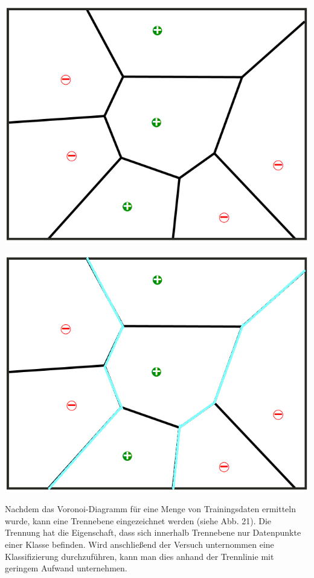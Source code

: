 \documentclass[a4paper]{scrartcl}
\begin{document}
\begin{multicols}{2}
            \includegraphics[width=\linewidth]{vor2.png}
                        
            \includegraphics[width=\linewidth]{vor3.png}
                        
            Nachdem das Voronoi-Diagramm für eine Menge von Trainingsdaten ermitteln wurde, kann eine Trennebene eingezeichnet werden (siehe Abb. 21). Die Trennung hat die Eigenschaft, dass sich innerhalb Trennebene nur Datenpunkte einer Klasse befinden. Wird anschließend der Versuch unternommen eine Klassifizierung durchzuführen, kann man dies anhand der Trennlinie mit geringem Aufwand unternehmen.
                         

\end{multicols}
\end{document}
